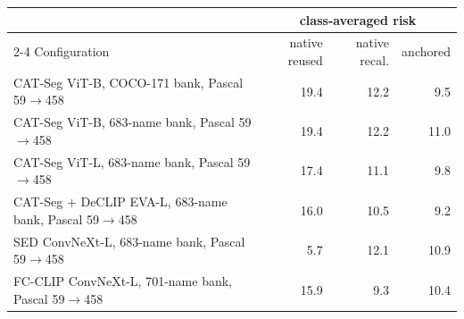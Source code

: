 \begin{tabular}{@{}lrrr@{}}
\toprule
& \multicolumn{3}{c}{class-averaged risk} \\
\cmidrule(l){2-4}
Configuration & native reused & native recal. & anchored \\
\midrule
CAT-Seg ViT-B, COCO-171 bank, Pascal 59$\to$458 & 19.4 & 12.2 & 9.5 \\
CAT-Seg ViT-B, 683-name bank, Pascal 59$\to$458 & 19.4 & 12.2 & 11.0 \\
CAT-Seg ViT-L, 683-name bank, Pascal 59$\to$458 & 17.4 & 11.1 & 9.8 \\
CAT-Seg + DeCLIP EVA-L, 683-name bank, Pascal 59$\to$458 & 16.0 & 10.5 & 9.2 \\
SED ConvNeXt-L, 683-name bank, Pascal 59$\to$458 & 5.7 & 12.1 & 10.9 \\
FC-CLIP ConvNeXt-L, 701-name bank, Pascal 59$\to$458 & 15.9 & 9.3 & 10.4 \\
\bottomrule
\end{tabular}
